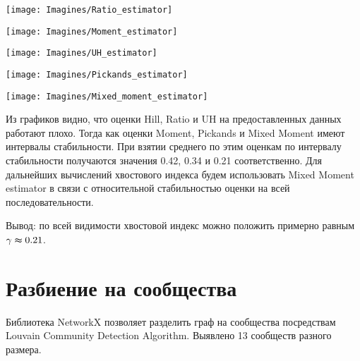 \documentclass[reprint, amsmath, amssymb, aps,]{revtex4-2}
\begin{document}
\begin{center}
\centering 
\texttt{[image: Imagines/Ratio\_estimator]}
\end{center}

\begin{center}
\centering 
\texttt{[image: Imagines/Moment\_estimator]}
\end{center}

\begin{center}
\centering 
\texttt{[image: Imagines/UH\_estimator]}
\end{center}

\begin{center}
\centering 
\texttt{[image: Imagines/Pickands\_estimator]}
\end{center}

\begin{center}
\centering 
\texttt{[image: Imagines/Mixed\_moment\_estimator]}
\end{center}

Из графиков видно, что оценки Hill, Ratio и UH на предоставленных данных работают плохо. Тогда как оценки Moment, Pickands и Mixed Moment имеют интервалы стабильности. При взятии среднего по этим оценкам по интервалу стабильности получаются значения 0.42, 0.34 и 0.21 соответственно. Для дальнейших вычислений хвостового индекса будем использовать Mixed Moment estimator в связи с относительной стабильностью оценки на всей последовательности.

Вывод: по всей видимости хвостовой индекс можно положить примерно равным $\gamma \thickapprox 0.21$.    



\section{Разбиение на сообщества}
Библиотека NetworkX позволяет разделить граф на сообщества посредствам Louvain Community Detection Algorithm. Выявлено 13 сообществ разного размера.
\end{document}
